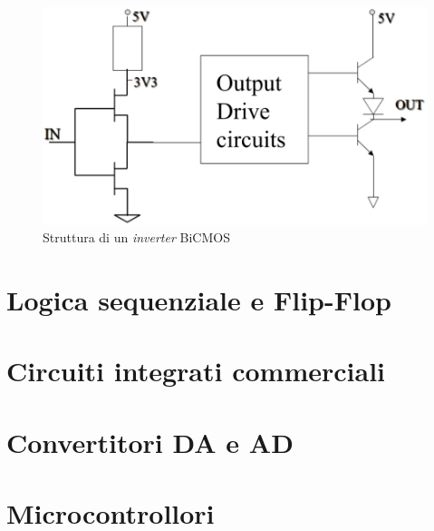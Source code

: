 \documentclass[12pt, a4paper]{report}
\begin{document}
\begin{figure}[h]
    \centering
    \includegraphics[scale=0.4,angle=0]{bicmos3.png}
    \caption{Struttura di un \textit{inverter} BiCMOS}
    \label{odc}
\end{figure}


\chapter{Logica sequenziale e Flip-Flop}
\chapter{Circuiti integrati commerciali}
\chapter{Convertitori DA e AD}
\chapter{Microcontrollori}
\end{document}

